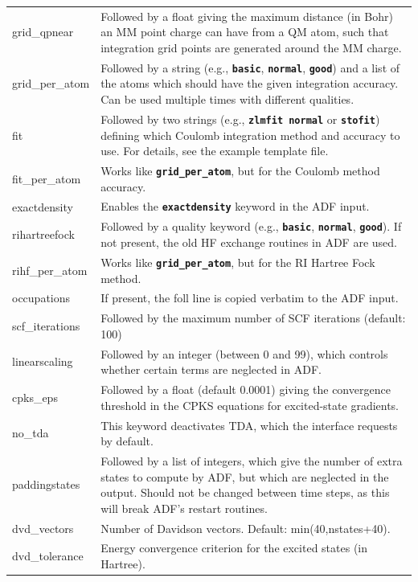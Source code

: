 \documentclass[a4paper,10pt,DIV=15,openany,twoside=false]{scrbook}
\newcommand{\ttt}[1]{\textbf{\texttt{#1}}}
\begin{document}
\begin{table}
\begin{tabular}{>{\ttfamily}lp{12cm}}
\\
grid\_qpnear            &Followed by a float giving the maximum distance (in Bohr) an MM point charge can have from a QM atom, such that integration grid points are generated around the MM charge.
\\
grid\_per\_atom         &Followed by a string (e.g., \ttt{basic}, \ttt{normal}, \ttt{good}) and a list of the atoms which should have the given integration accuracy. Can be used multiple times with different qualities.
\\
fit                     &Followed by two strings (e.g., \ttt{zlmfit normal} or \ttt{stofit}) defining which Coulomb integration method and accuracy to use. For details, see the example template file.
\\
fit\_per\_atom          &Works like \ttt{grid\_per\_atom}, but for the Coulomb method accuracy.
\\
exactdensity            &Enables the \ttt{exactdensity} keyword in the ADF input.
\\
rihartreefock           &Followed by a quality keyword (e.g., \ttt{basic}, \ttt{normal}, \ttt{good}). If not present, the old HF exchange routines in ADF are used.
\\
rihf\_per\_atom         &Works like \ttt{grid\_per\_atom}, but for the RI Hartree Fock method.
\\
occupations             &If present, the foll line is copied verbatim to the ADF input.
\\
scf\_iterations         &Followed by the maximum number of SCF iterations (default: 100)
\\
linearscaling           &Followed by an integer (between 0 and 99), which controls whether certain terms are neglected in ADF.
\\
cpks\_eps               &Followed by a float (default 0.0001) giving the convergence threshold in the CPKS equations for excited-state gradients.
\\
no\_tda                 &This keyword deactivates TDA, which the interface requests by default.
\\
paddingstates           &Followed by a list of integers, which give the number of extra states to compute by ADF, but which are neglected in the output. Should not be changed between time steps, as this will break ADF's restart routines.
\\
dvd\_vectors            &Number of Davidson vectors. Default: min(40,nstates+40).
\\
dvd\_tolerance          &Energy convergence criterion for the excited states (in Hartree).

\end{tabular}
\end{table}
\end{document}
